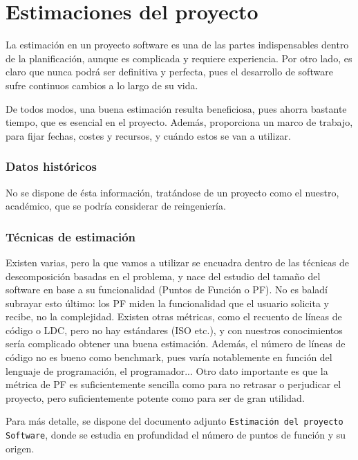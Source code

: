 \documentclass[spanish,a4paper,12pt]{report}	%
\begin{document}
\newpage
\mbox{}
\thispagestyle{empty}						%
\newpage
\setcounter{section}{0}

\part{Estimaciones del proyecto}

La estimación en un proyecto software es una de las partes indispensables dentro de la planificación, aunque es complicada y requiere experiencia. Por otro lado, es claro que nunca podrá ser definitiva y perfecta, pues el desarrollo de software sufre continuos cambios a lo largo de su vida. 

De todos modos, una buena estimación resulta beneficiosa, pues ahorra bastante tiempo, que es esencial en el proyecto. Además, proporciona un marco de trabajo, para fijar fechas, costes y recursos, y cuándo estos se van a utilizar.

	\section{Datos históricos}
	No se dispone de ésta información, tratándose de un proyecto como el nuestro, académico, que se podría considerar de reingeniería. 

	\section{Técnicas de estimación}
	Existen varias, pero la que vamos a utilizar se encuadra dentro de las técnicas de descomposición basadas en el problema, y nace del estudio del tamaño del software en base a su funcionalidad (Puntos de Función o PF). No es baladí subrayar esto último: los PF miden la funcionalidad que el usuario solicita y recibe, no la complejidad. Existen otras métricas, como el recuento de líneas de código o LDC, pero no hay estándares (ISO etc.), y con nuestros conocimientos sería complicado obtener una buena estimación. Además, el número de líneas de código no es bueno como benchmark, pues varía notablemente en función del lenguaje de programación, el programador... Otro dato importante es que la métrica de PF es suficientemente sencilla como para no retrasar o perjudicar el proyecto, pero suficientemente potente como para ser de gran utilidad.


	Para más detalle, se dispone del documento adjunto \texttt{Estimación del proyecto Software}, donde se estudia en profundidad el número de puntos de función y su origen.
\end{document}
